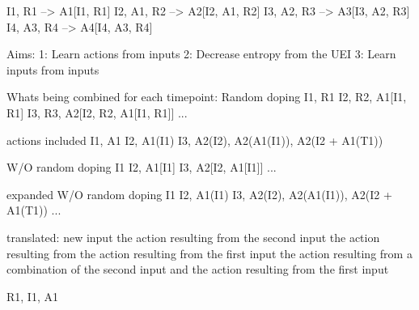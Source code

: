 I1, R1        -->    A1[I1, R1]
I2, A1, R2    -->    A2[I2, A1, R2]
I3, A2, R3    -->    A3[I3, A2, R3]
I4, A3, R4    -->    A4[I4, A3, R4]

Aims:
1: Learn actions from inputs
2: Decrease entropy from the UEI
3: Learn inputs from inputs

Whats being combined for each timepoint:
Random doping
I1, R1
I2, R2, A1[I1, R1]
I3, R3, A2[I2, R2, A1[I1, R1]]
...

actions included
I1, A1
I2, A1(I1)
I3, A2(I2), A2(A1(I1)), A2(I2 + A1(T1))

W/O random doping
I1
I2, A1[I1]
I3, A2[I2, A1[I1]]
...

expanded W/O random doping
I1
I2, A1(I1)
I3, A2(I2), A2(A1(I1)), A2(I2 + A1(T1))
...

translated:
new input
the action resulting from the second input
the action resulting from the action resulting from the first input
the action resulting from a combination of the second input and the action resulting from the first input 

R1, I1, A1
